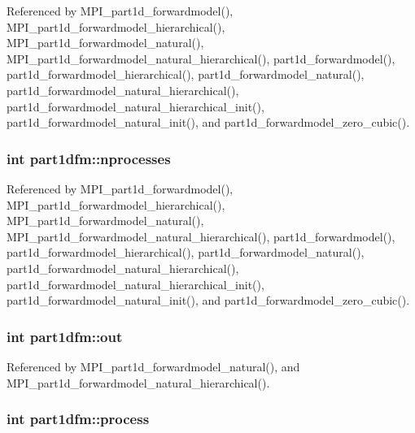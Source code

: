 Referenced by M\+P\+I\+\_\+part1d\+\_\+forwardmodel(), M\+P\+I\+\_\+part1d\+\_\+forwardmodel\+\_\+hierarchical(), M\+P\+I\+\_\+part1d\+\_\+forwardmodel\+\_\+natural(), M\+P\+I\+\_\+part1d\+\_\+forwardmodel\+\_\+natural\+\_\+hierarchical(), part1d\+\_\+forwardmodel(), part1d\+\_\+forwardmodel\+\_\+hierarchical(), part1d\+\_\+forwardmodel\+\_\+natural(), part1d\+\_\+forwardmodel\+\_\+natural\+\_\+hierarchical(), part1d\+\_\+forwardmodel\+\_\+natural\+\_\+hierarchical\+\_\+init(), part1d\+\_\+forwardmodel\+\_\+natural\+\_\+init(), and part1d\+\_\+forwardmodel\+\_\+zero\+\_\+cubic().

\subsubsection[{\texorpdfstring{nprocesses}{nprocesses}}]{\setlength{\rightskip}{0pt plus 5cm}int part1dfm\+::nprocesses}\hypertarget{structpart1dfm_adab33948ead9e6b860f6c62fdf582bab}{}\label{structpart1dfm_adab33948ead9e6b860f6c62fdf582bab}


Referenced by M\+P\+I\+\_\+part1d\+\_\+forwardmodel(), M\+P\+I\+\_\+part1d\+\_\+forwardmodel\+\_\+hierarchical(), M\+P\+I\+\_\+part1d\+\_\+forwardmodel\+\_\+natural(), M\+P\+I\+\_\+part1d\+\_\+forwardmodel\+\_\+natural\+\_\+hierarchical(), part1d\+\_\+forwardmodel(), part1d\+\_\+forwardmodel\+\_\+hierarchical(), part1d\+\_\+forwardmodel\+\_\+natural(), part1d\+\_\+forwardmodel\+\_\+natural\+\_\+hierarchical(), part1d\+\_\+forwardmodel\+\_\+natural\+\_\+hierarchical\+\_\+init(), part1d\+\_\+forwardmodel\+\_\+natural\+\_\+init(), and part1d\+\_\+forwardmodel\+\_\+zero\+\_\+cubic().

\subsubsection[{\texorpdfstring{out}{out}}]{\setlength{\rightskip}{0pt plus 5cm}int part1dfm\+::out}\hypertarget{structpart1dfm_a2221ddee0c919d4f06f843ddf2c86ccf}{}\label{structpart1dfm_a2221ddee0c919d4f06f843ddf2c86ccf}


Referenced by M\+P\+I\+\_\+part1d\+\_\+forwardmodel\+\_\+natural(), and M\+P\+I\+\_\+part1d\+\_\+forwardmodel\+\_\+natural\+\_\+hierarchical().

\subsubsection[{\texorpdfstring{process}{process}}]{\setlength{\rightskip}{0pt plus 5cm}int part1dfm\+::process}\hypertarget{structpart1dfm_a849be055c11e99ecb05c9310a13b0e39}{}\label{structpart1dfm_a849be055c11e99ecb05c9310a13b0e39}


